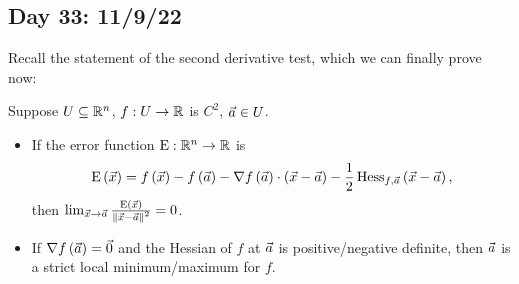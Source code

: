 \documentclass[main.tex]{subfiles}
\begin{document}
\subsection{Day 33: 11/9/22}

Recall the statement of the second derivative test, which we can finally prove now:

\begin{theorem}
    Suppose $U\subseteq \mathbb R^n$, $f : U \to \mathbb R$ is $C^2$, $\vec{a} \in U$.
    \begin{itemize}
        \item If the error function $\mathrm{E} : \mathbb R^n \to \mathbb R$ is
        \[\mathrm{E}\left( \vec{x} \right) = f\left( \vec{x} \right) - f\left( \vec{a} \right) - \nabla f\left( \vec{a} \right)\cdot\left( \vec{x} - \vec{a} \right) - \frac{1}{2}\operatorname{Hess}_{f, \vec{a}}\left( \vec{x} - \vec{a} \right),\]
        then $\lim_{\vec{x}\to \vec{a}} \frac{\mathrm{E}\left( \vec{x} \right)}{\left\lVert \vec{x} - \vec{a} \right\rVert^2} = 0$.
        \item If $\nabla f\left( \vec{a} \right) = \vec{0}$ and the Hessian of $f$ at $\vec{a}$ is positive/negative definite, then $\vec{a}$ is a strict local minimum/maximum for $f$.
    \end{itemize}
\end{theorem}
\end{document}
